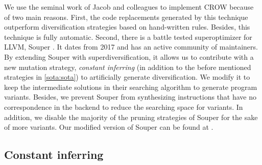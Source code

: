 We use the seminal work of Jacob and colleagues to implement CROW because of two main reasons.
First, the code replacements generated by this technique outperform diversification strategies based on hand-written rules. Besides, this technique is fully automatic.
Second, there is a battle tested superoptimizer for LLVM, Souper \cite{Sasnauskas2017Souper:Superoptimizer}. It dates from 2017 and has an active community of maintainers. By extending Souper with superdiversification, it allows us to contribute with a new mutation strategy, \emph{constant inferring} (in addition to the before mentioned strategies in \autoref{sota:sota}) to artificially generate diversification. We modify it to keep the intermediate solutions in their searching algorithm to generate program variants. Besides, 
we prevent Souper from synthesizing instructions that have no correspondence in the \wasm backend to reduce the searching space for variants. In addition, we disable the majority of the pruning strategies of Souper for the sake of more variants. Our modified version of Souper can be found at \todo{}.



\subsection*{Constant inferring}

